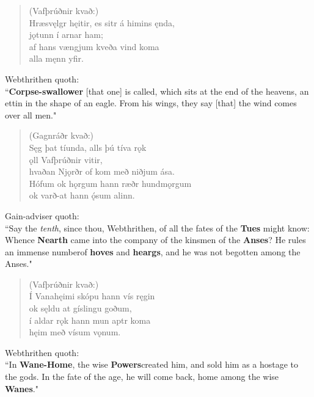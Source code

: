 \begin{verse}
(Vafþrúðnir kvað:) \\%
\bva Hræsvęlgr hęitir, \hld es sitr á himins ęnda, \\%
\ind jǫtunn í arnar ham; \\%
af hans vængjum \hld kveða vind koma \\%
\ind alla męnn yfir.\\%
\end{verse}

\bvb Webthrithen quoth: \\ “\textbf{Corpse-swallower} [that one] is called, which sits at the end of the heavens, an ettin in the shape of an eagle. From his wings, they say [that] the wind comes over all men." \\

\begin{verse}
(Gagnráðr kvað:) \\%
\bva Sęg þat tíunda, \hld alls þú tíva rǫk \\%
\ind ǫll Vafþrúðnir vitir, \\%
hvaðan Njǫrðr of kom \hld með niðjum ása. \\%
Hófum ok hǫrgum \hld hann ræðr hundmǫrgum \\%
\ind ok varð-at hann ǫ́sum alinn.\\%
\end{verse}

\bvb Gain-adviser quoth: \\ “Say the \emph{tenth}, since thou, Webthrithen, of all the fates of the \textbf{Tues} might know: Whence \textbf{Nearth} came into the company of the kinsmen of the \textbf{Anses}? He rules an immense number\footnotemark[68] of \textbf{hoves} and \textbf{heargs}, and he was not begotten among the Anses." \\

\begin{verse}
(Vafþrúðnir kvað:) \\%
\bva Í Vanahęimi \hld skópu hann vís ręgin \\%
\ind ok sęldu at gíslingu goðum, \\%
í aldar rǫk \hld hann mun aptr koma \\%
\ind hęim með vísum vǫnum.\\%
\end{verse}

\bvb Webthrithen quoth: \\ “In \textbf{Wane-Home}, the wise \textbf{Powers}\footnotemark[69] created him, and sold him as a hostage to the gods. In the fate of the age, he will come back, home among the wise \textbf{Wanes}." \\

